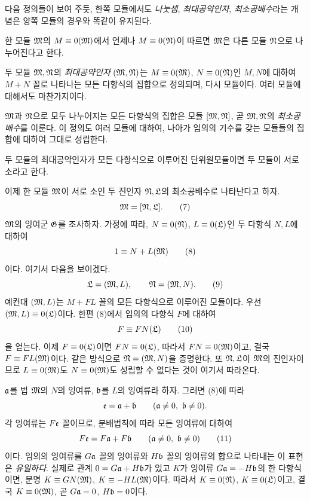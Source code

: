 
다음 정의들이 보여 주듯, 한쪽 모듈에서도 \emph{나눗셈}, \emph{최대공약인자}, \emph{최소공배수}라는 개념은 양쪽 모듈의 경우와 똑같이 유지된다.

한 모듈 \(\mathfrak M\)의 \(M\equiv0(\mathfrak M)\)에서 언제나 \(M\equiv0(\mathfrak N)\)이 따르면 \(\mathfrak M\)은 다른 모듈 \(\mathfrak N\)으로 나누어진다고 한다.

두 모듈 \(\mathfrak M,\mathfrak N\)의 \emph{최대공약인자} \((\mathfrak M,\mathfrak N)\)는 \(M\equiv0(\mathfrak M)\), \(N\equiv0(\mathfrak N)\)인 \(M,N\)에 대하여 \(M+N\) 꼴로 나타나는 모든 다항식의 집합으로 정의되며, 다시 모듈이다. 여러 모듈에 대해서도 마찬가지이다.

\(\mathfrak M\)과 \(\mathfrak N\)으로 모두 나누어지는 모든 다항식의 집합은 모듈 \([\mathfrak M,\mathfrak N]\), 곧 \(\mathfrak M,\mathfrak N\)의 \emph{최소공배수}를 이룬다. 이 정의도 여러 모듈에 대하여, 나아가 임의의 기수를 갖는 모듈들의 집합에 대하여 그대로 성립한다.

두 모듈의 최대공약인자가 모든 다항식으로 이루어진 단위원모듈이면 두 모듈이 서로 소라고 한다.

이제 한 모듈 \(\mathfrak M\)이 서로 소인 두 진인자 \(\mathfrak N,\mathfrak L\)의 최소공배수로 나타난다고 하자.
\begin{equation}
 \mathfrak M=[\mathfrak N,\mathfrak L].
\tag{7}
\end{equation}
\(\mathfrak M\)의 잉여군 \(\mathfrak G\)를 조사하자. 가정에 따라, \(N\equiv0(\mathfrak N)\), \(L\equiv0(\mathfrak L)\)인 두 다항식 \(N,L\)에 대하여
\begin{equation}
 1\equiv N+L(\mathfrak M)
\tag{8}
\end{equation}
이다. 여기서 다음을 보이겠다.
\begin{equation}
 \mathfrak L=(\mathfrak M,L),\qquad \mathfrak N=(\mathfrak M,N).
\tag{9}
\end{equation}
예컨대 \((\mathfrak M,L)\)는 \(M+FL\) 꼴의 모든 다항식으로 이루어진 모듈이다. 우선 \((\mathfrak M,L)\equiv0(\mathfrak L)\)이다. 한편 (8)에서 임의의 다항식 \(F\)에 대하여
\begin{equation}
 F\equiv FN(\mathfrak L)
\tag{10}
\end{equation}
을 얻는다. 이제 \(F\equiv0(\mathfrak L)\)이면 \(FN\equiv0(\mathfrak L)\), 따라서 \(FN\equiv0(\mathfrak M)\)이고, 결국 \(F\equiv FL(\mathfrak M)\)이다. 같은 방식으로 \(\mathfrak N=(\mathfrak M,N)\)을 증명한다. 또 \(\mathfrak N,\mathfrak L\)이 \(\mathfrak M\)의 진인자이므로 \(L\equiv0(\mathfrak M)\)도 \(N\equiv0(\mathfrak M)\)도 성립할 수 없다는 것이 여기서 따라온다.

\(\mathfrak{a}\)를 법 \(\mathfrak M\)의 \(N\)의 잉여류, \(\mathfrak{b}\)를 \(L\)의 잉여류라 하자. 그러면 (8)에 따라
\[
 \mathfrak e=\mathfrak{a}+\mathfrak{b}\qquad(\mathfrak{a}\ne0,\ \mathfrak{b}\ne0).
\]
각 잉여류는 \(F\mathfrak e\) 꼴이므로, 분배법칙에 따라 모든 잉여류에 대하여
\begin{equation}
 F\mathfrak e=F\mathfrak{a}+F\mathfrak{b}\qquad(\mathfrak{a}\ne0,\ \mathfrak{b}\ne0)
\tag{11}
\end{equation}
이다. 임의의 잉여류를 \(G\mathfrak{a}\) 꼴의 잉여류와 \(H\mathfrak{b}\) 꼴의 잉여류의 합으로 나타내는 이 표현은 \emph{유일하다}. 실제로 관계 \(0=G\mathfrak{a}+H\mathfrak{b}\)가 있고 \(K\)가 잉여류 \(G\mathfrak{a}=-H\mathfrak{b}\)의 한 다항식이면, 분명 \(K\equiv GN(\mathfrak M)\), \(K\equiv-HL(\mathfrak M)\)이다. 따라서 \(K\equiv0(\mathfrak N)\), \(K\equiv0(\mathfrak L)\)이고, 결국 \(K\equiv0(\mathfrak M)\), 곧 \(G\mathfrak{a}=0\), \(H\mathfrak{b}=0\)이다.

